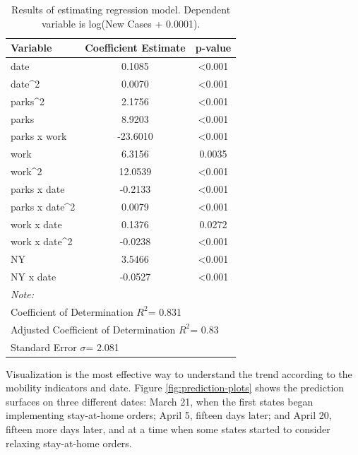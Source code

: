 \documentclass[]{elsarticle} %
\begin{document}
\begin{table}[H]

\caption{\label{tab:model-results}\label{tab:model-results}Results of estimating regression model. Dependent variable is log(New Cases + 0.0001).}
\centering
\fontsize{7}{9}\selectfont
\begin{tabular}[t]{lcc}
\toprule
Variable & Coefficient Estimate & p-value\\
\midrule
\rowcolor{gray!6}  date & 0.1085 & <0.001\\
date\textasciicircum{}2 & 0.0070 & <0.001\\
\rowcolor{gray!6}  parks\textasciicircum{}2 & 2.1756 & <0.001\\
parks & 8.9203 & <0.001\\
\rowcolor{gray!6}  parks x work & -23.6010 & <0.001\\
\addlinespace
work & 6.3156 & 0.0035\\
\rowcolor{gray!6}  work\textasciicircum{}2 & 12.0539 & <0.001\\
parks x date & -0.2133 & <0.001\\
\rowcolor{gray!6}  parks x date\textasciicircum{}2 & 0.0079 & <0.001\\
work x date & 0.1376 & 0.0272\\
\addlinespace
\rowcolor{gray!6}  work x date\textasciicircum{}2 & -0.0238 & <0.001\\
NY & 3.5466 & <0.001\\
\rowcolor{gray!6}  NY x date & -0.0527 & <0.001\\
\bottomrule
\multicolumn{3}{l}{\textit{Note: }}\\
\multicolumn{3}{l}{Coefficient of Determination $R^2$= 0.831}\\
\multicolumn{3}{l}{Adjusted Coefficient of Determination $R^2$= 0.83}\\
\multicolumn{3}{l}{Standard Error $\sigma$= 2.081}\\
\end{tabular}
\end{table}

Visualization is the most effective way to understand the trend
according to the mobility indicators and date. Figure
\ref{fig:prediction-plots} shows the prediction surfaces on three
different dates: March 21, when the first states began implementing
stay-at-home orders; April 5, fifteen days later; and April 20, fifteen
more days later, and at a time when some states started to consider
relaxing stay-at-home orders.
\end{document}
